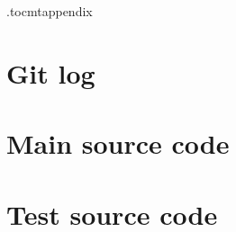 \documentclass[a4paper,12pt]{article}
\begin{document}
\newpage
\appendix

\etocdepthtag.toc{mtappendix}
\tableofcontents‎‎

\section{Git log}



\section{Main source code}



\section{Test source code}


\end{document}
